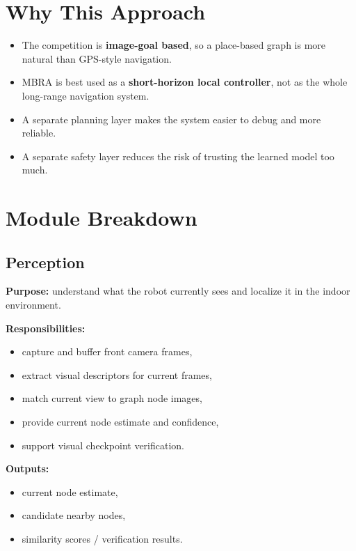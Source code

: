 \documentclass[11pt,a4paper]{article}
\begin{document}
\section{Why This Approach}

\begin{itemize}[nosep]
  \item The competition is \textbf{image-goal based}, so a place-based graph is
        more natural than GPS-style navigation.
  \item MBRA is best used as a \textbf{short-horizon local controller}, not as
        the whole long-range navigation system.
  \item A separate planning layer makes the system easier to debug and more reliable.
  \item A separate safety layer reduces the risk of trusting the learned model too much.
\end{itemize}


\section{Module Breakdown}

\subsection{Perception}

\textbf{Purpose:} understand what the robot currently sees and localize it in
the indoor environment.

\textbf{Responsibilities:}
\begin{itemize}[nosep]
  \item capture and buffer front camera frames,
  \item extract visual descriptors for current frames,
  \item match current view to graph node images,
  \item provide current node estimate and confidence,
  \item support visual checkpoint verification.
\end{itemize}

\textbf{Outputs:}
\begin{itemize}[nosep]
  \item current node estimate,
  \item candidate nearby nodes,
  \item similarity scores / verification results.
\end{itemize}
\end{document}
